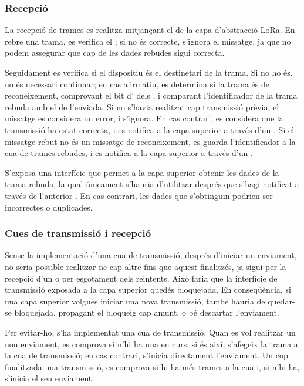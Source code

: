 \documentclass{tfgitic}[2024/07/01]
\begin{document}
\subsubsection{Recepció}
La recepció de trames es realitza mitjançant el  de la capa d'abstracció LoRa. En rebre una trama, es verifica el ; si no és correcte, s'ignora el missatge, ja que no podem assegurar que cap de les dades rebudes sigui correcta.

Seguidament es verifica si el dispositiu és el destinetari de la trama. Si no ho és, no és necessari continuar; en cas afirmatiu, es determina si la trama és de reconeixement, comprovant el bit d' dels , i comparant l'identificador de la trama rebuda amb el de l'enviada. Si no s'havia realitzat cap transmissió prèvia, el missatge es considera un error, i s'ignora. En cas contrari, es considera que la transmissió ha estat correcta, i es notifica a la capa superior a través d'un . Si el missatge rebut no és un missatge de reconeixement, es guarda l'identificador a la cua de trames rebudes, i es notifica a la capa superior a través d'un .

S'exposa una interfície que permet a la capa superior obtenir les dades de la trama rebuda, la qual únicament s'hauria d'utilitzar després que s'hagi notificat a través de l'anterior . En cas contrari, les dades que s'obtinguin podrien ser incorrectes o duplicades.
\subsubsection{Cues de transmissió i recepció}
Sense la implementació d'una cua de transmissió, després d'iniciar un enviament, no seria possible realitzar-ne cap altre fins que aquest finalitzés, ja sigui per la recepció d’un  o per esgotament dels reintents. Això faria que la interfície de transmissió exposada a la capa superior quedés bloquejada. En conseqüència, si una capa superior volgués iniciar una nova transmissió, també hauria de quedar-se bloquejada, propagant el bloqueig cap amunt, o bé descartar l’enviament.

Per evitar-ho, s'ha implementat una cua de transmissió. Quan es vol realitzar un nou enviament, es comprova si n'hi ha una en curs: si és així, s'afegeix la trama a la cua de transmissió; en cas contrari, s'inicia directament l'enviament. Un cop finalitzada una transmissió, es comprova si hi ha més trames a la cua i, si n'hi ha, s'inicia el seu enviament.
\end{document}
